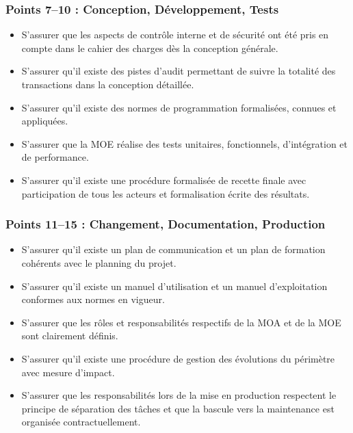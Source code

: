 \subsubsection{Points 7--10 : Conception, Développement, Tests}
\begin{itemize}
    \item S'assurer que les aspects de contrôle interne et de sécurité ont été pris en compte dans le cahier des charges dès la conception générale.
    \item S'assurer qu'il existe des pistes d'audit permettant de suivre la totalité des transactions dans la conception détaillée.
    \item S'assurer qu'il existe des normes de programmation formalisées, connues et appliquées.
    \item S'assurer que la MOE réalise des tests unitaires, fonctionnels, d'intégration et de performance.
    \item S'assurer qu'il existe une procédure formalisée de recette finale avec participation de tous les acteurs et formalisation écrite des résultats.
\end{itemize}

\subsubsection{Points 11--15 : Changement, Documentation, Production}
\begin{itemize}
    \item S'assurer qu'il existe un plan de communication et un plan de formation cohérents avec le planning du projet.
    \item S'assurer qu'il existe un manuel d'utilisation et un manuel d'exploitation conformes aux normes en vigueur.
    \item S'assurer que les rôles et responsabilités respectifs de la MOA et de la MOE sont clairement définis.
    \item S'assurer qu'il existe une procédure de gestion des évolutions du périmètre avec mesure d'impact.
    \item S'assurer que les responsabilités lors de la mise en production respectent le principe de séparation des tâches et que la bascule vers la maintenance est organisée contractuellement.
\end{itemize}

